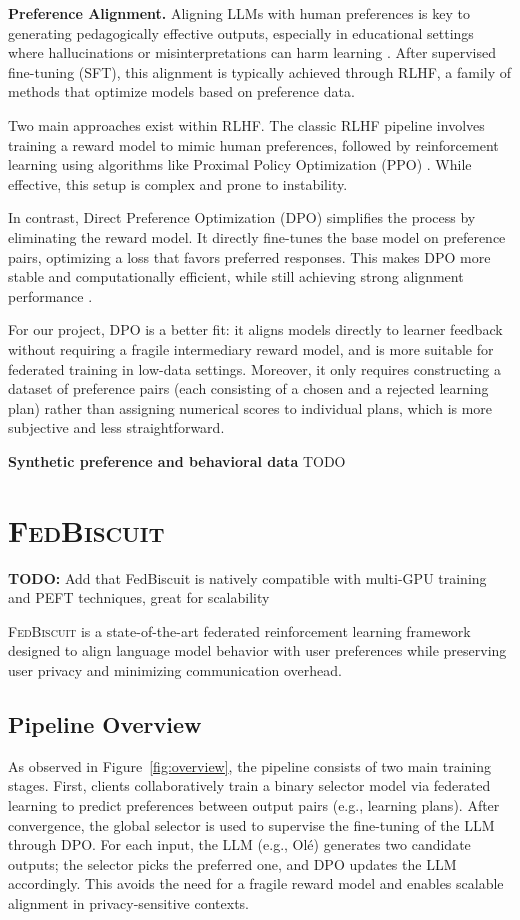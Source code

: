 \documentclass[sigconf]{acmart}
\begin{document}
\textbf{Preference Alignment.} Aligning LLMs with human preferences is key to generating pedagogically effective outputs, especially in educational settings where hallucinations or misinterpretations can harm learning \citep{wang2023aligning}. After supervised fine-tuning (SFT), this alignment is typically achieved through RLHF, a family of methods that optimize models based on preference data.

Two main approaches exist within RLHF. The classic RLHF pipeline involves training a reward model to mimic human preferences, followed by reinforcement learning using algorithms like Proximal Policy Optimization (PPO) \citep{schulman2017proximalpolicyoptimizationalgorithms}. While effective, this setup is complex and prone to instability.

In contrast, Direct Preference Optimization (DPO) \citep{Rafailov2023DirectPO} simplifies the process by eliminating the reward model. It directly fine-tunes the base model on preference pairs, optimizing a loss that favors preferred responses. This makes DPO more stable and computationally efficient, while still achieving strong alignment performance \citep{casper2023open}.

For our project, DPO is a better fit: it aligns models directly to learner feedback without requiring a fragile intermediary reward model, and is more suitable for federated training in low-data settings. Moreover, it only requires constructing a dataset of preference pairs (each consisting of a chosen and a rejected learning plan) rather than assigning numerical scores to individual plans, which is more subjective and less straightforward.

\textbf{Synthetic preference and behavioral data} TODO

\section{\textsc{FedBiscuit}}

\textbf{TODO:} Add that FedBiscuit is natively compatible with multi-GPU training and PEFT techniques, great for scalability
\vspace{0.5cm}

\textsc{FedBiscuit} is a state-of-the-art federated reinforcement learning framework designed to align language model behavior with user preferences while preserving user privacy and minimizing communication overhead.

\subsection{Pipeline Overview}
As observed in Figure~\ref{fig:overview}, the pipeline consists of two main training stages. First, clients collaboratively train a binary selector model via federated learning to predict preferences between output pairs (e.g., learning plans). After convergence, the global selector is used to supervise the fine-tuning of the LLM through DPO. For each input, the LLM (e.g., Ol\'e) generates two candidate outputs; the selector picks the preferred one, and DPO updates the LLM accordingly. This avoids the need for a fragile reward model and enables scalable alignment in privacy-sensitive contexts.
\end{document}
